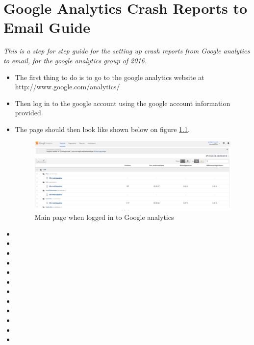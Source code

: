 \chapter{Google Analytics Crash Reports to Email Guide} \label{ChapCrashReport}
\textit{This is a step for step guide for the setting up crash reports from Google analytics to email, for the google analytics group of 2016.}

\begin{itemize}
	\item The first thing to do is to go to the google analytics website at http://www.google.com/analytics/ 
	\item Then log in to the google account using the google account information provided.
	\item The page should then look like shown below on figure \ref{MainPage}.
	\begin{figure}
		\includegraphics[width=0.8 \textwidth]{pictures/MainPage.png}
		\caption{Main page when logged in to Google analytics}
		\label{MainPage}
	\end{figure}
	\item
	\item
	\item
	\item
	\item
	\item
	\item
	\item
	\item
	\item
	\item
	\item
\end{itemize}
	